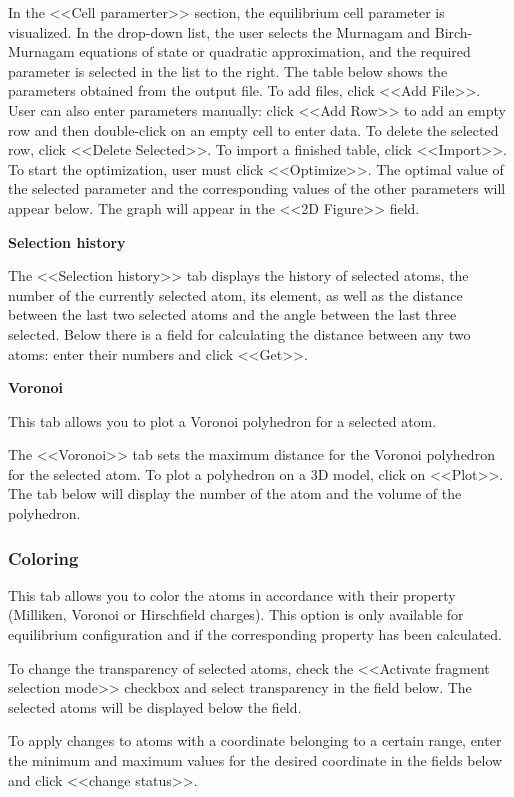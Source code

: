 \documentclass{article}
\begin{document}
In the <<Cell paramerter>> section, the equilibrium cell parameter is visualized. In the drop-down list, the user selects the Murnagam and Birch-Murnagam equations of state or quadratic approximation, and the required parameter is selected in the list to the right. The table below shows the parameters obtained from the output file. To add files, click <<Add File>>. User can also enter parameters manually: click <<Add Row>> to add an empty row and then double-click on an empty cell to enter data. To delete the selected row, click <<Delete Selected>>. To import a finished table, click <<Import>>. To start the optimization, user must click <<Optimize>>. The optimal value of the selected parameter and the corresponding values of the other parameters will appear below. The graph will appear in the <<2D Figure>> field.

\textbf{Selection history}

The <<Selection history>> tab displays the history of selected atoms, the number of the currently selected atom, its element, as well as the distance between the last two selected atoms and the angle between the last three selected. Below there is a field for calculating the distance between any two atoms: enter their numbers and click <<Get>>.

\textbf{Voronoi}

This tab allows you to plot a Voronoi polyhedron for a selected atom.

The <<Voronoi>> tab sets the maximum distance for the Voronoi polyhedron for the selected atom. To plot a polyhedron on a 3D model, click on <<Plot>>. The tab below will display the number of the atom and the volume of the polyhedron.

\subsubsection{Coloring}

This tab allows you to color the atoms in accordance with their property (Milliken, Voronoi or Hirschfield charges). This option is only available for equilibrium configuration and if the corresponding property has been calculated.

To change the transparency of selected atoms, check the <<Activate fragment selection mode>> checkbox and select transparency in the field below. The selected atoms will be displayed below the field.

To apply changes to atoms with a coordinate belonging to a certain range, enter the minimum and maximum values for the desired coordinate in the fields below and click <<change status>>.
\end{document}
